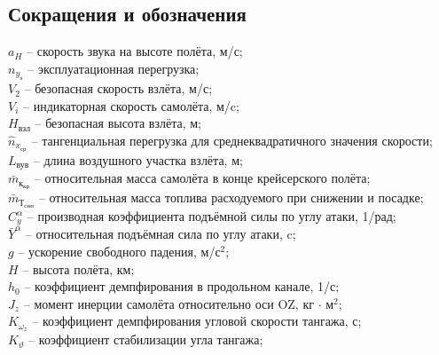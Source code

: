\newpage
\pagestyle{fancy}
\fancyhf{}
    \rfoot{ \thepage}
\begin{center}
     \section*{Сокращения и обозначения}
\end{center}
\newcommand{\Mza}{\bar{M}_z^\alpha}
\newcommand{\Mzwz}{\bar{M}_z^{\omega_z}}
\newcommand{\mza}{m_z^\alpha}
\newcommand{\mzwz}{m_z^{\omega_z}}
\newcommand{\mzf}{m_z^{\delta_{\text{э}}}}
\newcommand{\Cya}{C_y^\alpha}
\newcommand{\Mzf}{\bar{M}_z^{\delta_\text{э}}}
\newcommand{\mzwzch}{m_z^{\bar{\omega}_z}}
\newcommand{\mkkr}{\bar{m}_{\text{к}_\text{кр}}}
\newcommand{\mtcnp}{\bar{m}_{\text{Т}_\text{снп}}}
\newcommand{\ones}{\frac{1}{с}}
$a_H$ -- скорость звука на высоте полёта, м/с; \\
$n_{y_\text{э}}$ -- эксплуатационная перегрузка; \\
$V_2$ -- безопасная скорость взлёта, м/с;\\
$V_i$ -- индикаторная скорость самолёта, м/c; \\ 
$H_\text{взл}$ -- безопасная высота взлёта, м;\\
$\hat{n}_{x_\text{ср}}$ -- тангенциальная перегрузка для среднеквадратичного значения скорости;\\
$L_\text{вув}$ -- длина воздушного участка взлёта, м;\\
$\mkkr$ -- относительная масса самолёта в конце крейсерского полёта;\\
$\mtcnp$ -- относительная масса топлива расходуемого при снижении и посадке; \\
$\Cya$ -- производная коэффициента подъёмной силы по углу атаки, 1/рад; \\ 
$\bar{Y}^{\alpha}$ -- относительная подъёмная сила по углу атаки, c; \\
$g$ -- ускорение свободного падения, м/с$^2$; \\ 
$H$ -- высота полёта, км; \\ 
$h_0$ -- коэффициент демпфирования в продольном канале, 1/с;\\
$J_z$ -- момент инерции самолёта относительно оси OZ, кг $\cdot$ м$^2$; \\ 
$K_{\omega_z}$ -- коэффициент демпфирования угловой скорости тангажа, с;  \\
$K_{\vartheta}$ -- коэффициент стабилизации угла тангажа;\\
